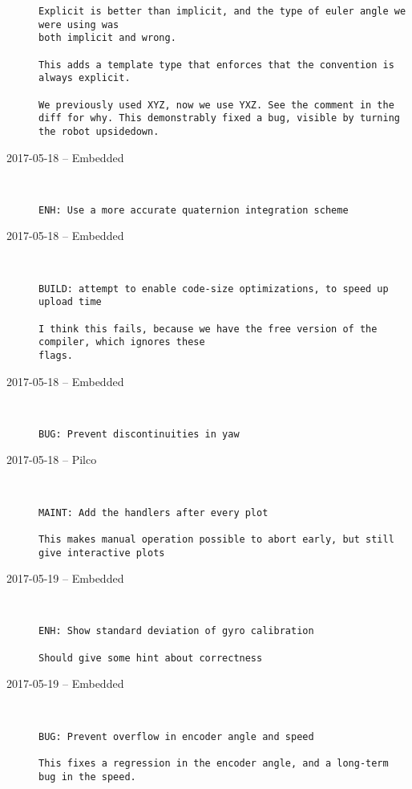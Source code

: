 \begin{description}
\begin{lstlisting}
Explicit is better than implicit, and the type of euler angle we were using was
both implicit and wrong.

This adds a template type that enforces that the convention is always explicit.

We previously used XYZ, now we use YXZ. See the comment in the diff for why. This demonstrably fixed a bug, visible by turning the robot upsidedown.
\end{lstlisting}


  \item[2017-05-18 -- Embedded] \hfill \
\begin{lstlisting}
ENH: Use a more accurate quaternion integration scheme
\end{lstlisting}


  \item[2017-05-18 -- Embedded] \hfill \
\begin{lstlisting}
BUILD: attempt to enable code-size optimizations, to speed up upload time

I think this fails, because we have the free version of the compiler, which ignores these
flags.
\end{lstlisting}


  \item[2017-05-18 -- Embedded] \hfill \
\begin{lstlisting}
BUG: Prevent discontinuities in yaw
\end{lstlisting}


  \item[2017-05-18 -- Pilco] \hfill \
\begin{lstlisting}
MAINT: Add the handlers after every plot

This makes manual operation possible to abort early, but still give interactive plots
\end{lstlisting}


  \item[2017-05-19 -- Embedded] \hfill \
\begin{lstlisting}
ENH: Show standard deviation of gyro calibration

Should give some hint about correctness
\end{lstlisting}


  \item[2017-05-19 -- Embedded] \hfill \
\begin{lstlisting}
BUG: Prevent overflow in encoder angle and speed

This fixes a regression in the encoder angle, and a long-term bug in the speed.
\end{lstlisting}



\end{description}

